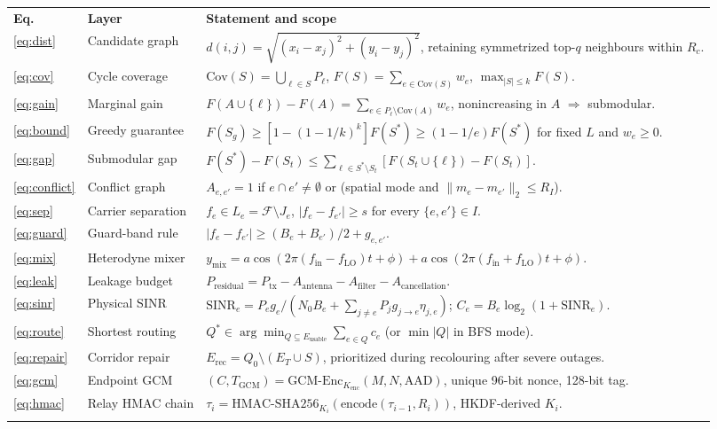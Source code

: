 \documentclass[10pt,a4paper]{article}
\newcommand\toprule{\noalign{\hrule height 0.8pt\vskip 2pt}}
\newcommand\midrule{\noalign{\vskip 1pt\hrule height 0.4pt\vskip 2pt}}
\newcommand\bottomrule{\noalign{\vskip 1pt\hrule height 0.8pt}}
\newcommand\thd[1]{\textbf{#1}}
\begin{document}
\begin{table}[h]
\footnotesize
\begin{tabularx}{\textwidth}{@{}P{0.9cm}P{2.6cm}L@{}}
\toprule
\thd{Eq.} & \thd{Layer} & \thd{Statement and scope}\\
\midrule
\eqref{eq:dist} & Candidate graph & $d(i,j)=\sqrt{(x_i-x_j)^2+(y_i-y_j)^2}$, retaining symmetrized top-$q$ neighbours within $R_c$.\\
\eqref{eq:cov} & Cycle coverage & $\mathrm{Cov}(S)=\bigcup_{\ell\in S}P_\ell$, $F(S)=\sum_{e\in\mathrm{Cov}(S)}w_e$, $\max_{|S|\le k}F(S)$.\\
\eqref{eq:gain} & Marginal gain & $F(A\cup\{\ell\})-F(A)=\sum_{e\in P_\ell\setminus\mathrm{Cov}(A)}w_e$, nonincreasing in $A$ $\Rightarrow$ submodular.\\
\eqref{eq:bound} & Greedy guarantee & $F(S_g)\ge[1-(1-1/k)^k]F(S^\ast)\ge(1-1/e)F(S^\ast)$ for fixed $L$ and $w_e\ge0$.\\
\eqref{eq:gap} & Submodular gap & $F(S^\ast)-F(S_t)\le\sum_{\ell\in S^\ast\setminus S_t}[F(S_t\cup\{\ell\})-F(S_t)]$.\\
\eqref{eq:conflict} & Conflict graph & $A_{e,e'}=1$ if $e\cap e'\ne\emptyset$ or (spatial mode and $\|m_e-m_{e'}\|_2\le R_I$).\\
\eqref{eq:sep} & Carrier separation & $f_e\in L_e=\mathcal F\setminus J_e$, $|f_e-f_{e'}|\ge s$ for every $\{e,e'\}\in I$.\\
\eqref{eq:guard} & Guard-band rule & $|f_e-f_{e'}|\ge(B_e+B_{e'})/2+g_{e,e'}$.\\
\eqref{eq:mix} & Heterodyne mixer & $y_\text{mix}=a\cos(2\pi(f_\text{in}-f_\text{LO})t+\phi)+a\cos(2\pi(f_\text{in}+f_\text{LO})t+\phi)$.\\
\eqref{eq:leak} & Leakage budget & $P_\text{residual}=P_\text{tx}-A_\text{antenna}-A_\text{filter}-A_\text{cancellation}$.\\
\eqref{eq:sinr} & Physical SINR & $\mathrm{SINR}_e=P_eg_e/(N_0B_e+\sum_{j\ne e}P_jg_{j\to e}\eta_{j,e})$; $C_e=B_e\log_2(1+\mathrm{SINR}_e)$.\\
\eqref{eq:route} & Shortest routing & $Q^\ast\in\arg\min_{Q\subseteq E_\text{usable}}\sum_{e\in Q}c_e$ (or $\min|Q|$ in BFS mode).\\
\eqref{eq:repair} & Corridor repair & $E_\text{rec}=Q_0\setminus(E_T\cup S)$, prioritized during recolouring after severe outages.\\
\eqref{eq:gcm} & Endpoint GCM & $(C,T_\text{GCM})=\text{GCM-Enc}_{K_\text{enc}}(M,N,\text{AAD})$, unique 96-bit nonce, 128-bit tag.\\
\eqref{eq:hmac} & Relay HMAC chain & $\tau_i=\text{HMAC-SHA256}_{K_i}(\mathrm{encode}(\tau_{i-1},R_i))$, HKDF-derived $K_i$.\\
\bottomrule
\end{tabularx}
\end{table}
\end{document}
